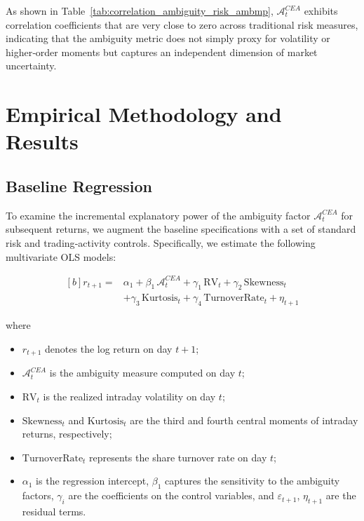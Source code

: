 \documentclass[preprint,12pt,authoryear]{elsarticle}
\begin{document}
As shown in Table~\ref{tab:correlation_ambiguity_risk_ambmp}, \(\mathcal{A}^{CEA}_t\) exhibits correlation coefficients that are very close to zero across traditional risk measures, indicating that the ambiguity metric does not simply proxy for volatility or higher‑order moments but captures an independent dimension of market uncertainty.

\section{Empirical Methodology and Results}
\label{sec:emiricalmet}

\subsection{Baseline Regression}

To examine the incremental explanatory power of the ambiguity factor \(\mathcal{A}^{CEA}_t\) for subsequent returns, we augment the baseline specifications with a set of standard risk and trading‑activity controls. Specifically, we estimate the following multivariate OLS models:



\begin{equation}
\begin{aligned}[b]
  r_{t+1} =& \alpha_1 + \beta_1\,\mathcal{A}^{CEA}_t
            + \gamma_{1}\,\mathrm{RV}_t
            + \gamma_{2}\,\mathrm{Skewness}_t \\
           & + \gamma_{3}\,\mathrm{Kurtosis}_t 
            + \gamma_{4}\,\mathrm{TurnoverRate}_t
            + \eta_{t+1}
\end{aligned}
\end{equation}

where
\begin{itemize}
  \item \(r_{t+1}\) denotes the log return on day \(t+1\);
  \item \(\mathcal{A}^{CEA}_t\) is the ambiguity measure computed on day \(t\);
  \item \(\mathrm{RV}_t\) is the realized intraday volatility on day \(t\);
  \item \(\mathrm{Skewness}_t\) and \(\mathrm{Kurtosis}_t\) are the third and fourth central moments of intraday returns, respectively;
  \item \(\mathrm{TurnoverRate}_t\) represents the share turnover rate on day \(t\);
  \item \(\alpha_1\) is the regression intercept, \(\beta_1\) captures the sensitivity to the ambiguity factors, \(\gamma_i\) are the coefficients on the control variables, and \(\varepsilon_{t+1}\), \(\eta_{t+1}\) are the residual terms.
\end{itemize}
\end{document}
